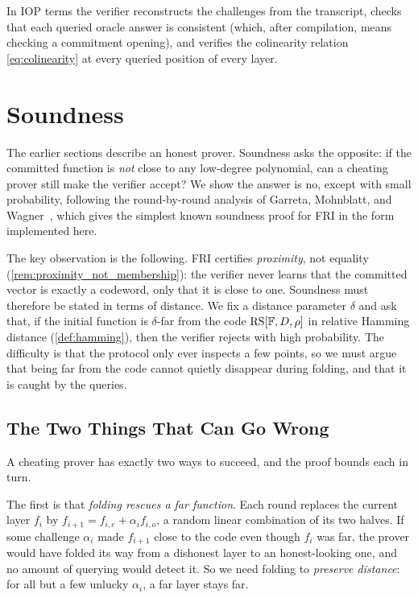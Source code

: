 In IOP terms the verifier reconstructs the challenges from the
transcript, checks that each queried oracle answer is consistent (which,
after compilation, means checking a commitment opening), and verifies the
colinearity relation \cref{eq:colinearity} at every queried position of
every layer.

\section{Soundness}
\label{sec:fri_soundness}

The earlier sections describe an honest prover. Soundness asks the
opposite: if the committed function is \emph{not} close to any low-degree
polynomial, can a cheating prover still make the verifier accept? We show
the answer is no, except with small probability, following the
round-by-round analysis of Garreta, Mohnblatt, and Wagner~\cite{GMW25},
which gives the simplest known soundness proof for FRI in the form
implemented here.

The key observation is the following. FRI certifies \emph{proximity},
not equality (\cref{rem:proximity_not_membership}): the verifier never
learns that the committed vector is exactly a codeword, only that it is
close to one. Soundness must therefore be stated in terms of distance. We
fix a distance parameter $\delta$ and ask that, if the initial function
is $\delta$-far from the code $\mathrm{RS}[\mathbb{F}, D, \rho]$ in relative Hamming
distance (\cref{def:hamming}), then the verifier rejects with high
probability. The difficulty is that the protocol only ever inspects a few
points, so we must argue that being far from the code cannot quietly
disappear during folding, and that it is caught by the queries.


\subsection{The Two Things That Can Go Wrong}
\label{subsec:two_risks}

A cheating prover has exactly two ways to succeed, and the proof bounds
each in turn.

The first is that \emph{folding rescues a far function}. Each round
replaces the current layer $f_i$ by
$f_{i+1} = f_{i,e} + \alpha_i f_{i,o}$, a random linear combination of its
two halves. If some challenge $\alpha_i$ made $f_{i+1}$ close to the code
even though $f_i$ was far, the prover would have folded its way from a
dishonest layer to an honest-looking one, and no amount of querying would
detect it. So we need folding to \emph{preserve distance}: for all but a
few unlucky $\alpha_i$, a far layer stays far.


